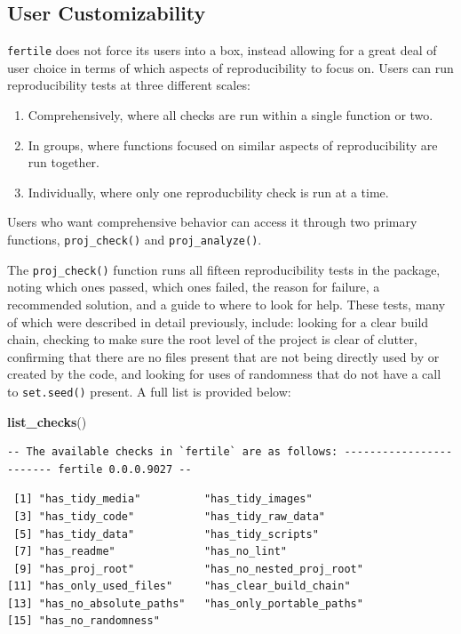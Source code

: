 \documentclass[12pt,twoside]{reedthesis}
\newenvironment{Shaded}{\begin{snugshade}}{\end{snugshade}}
\newcommand{\KeywordTok}[1]{\textcolor[rgb]{0.13,0.29,0.53}{\textbf{#1}}}
\newcommand{\NormalTok}[1]{#1}
\providecommand{\tightlist}{%
  \setlength{\itemsep}{0pt}\setlength{\parskip}{0pt}}
\begin{document}
\subsection{User Customizability}\label{user-customizability}

\texttt{fertile} does not force its users into a box, instead allowing
for a great deal of user choice in terms of which aspects of
reproducibility to focus on. Users can run reproducibility tests at
three different scales:
\begin{enumerate}
\def\labelenumi{\arabic{enumi})}
\tightlist
\item
  Comprehensively, where all checks are run within a single function or
  two.
\item
  In groups, where functions focused on similar aspects of
  reproducibility are run together.
\item
  Individually, where only one reproducbility check is run at a time.
\end{enumerate}
Users who want comprehensive behavior can access it through two primary
functions, \texttt{proj\_check()} and \texttt{proj\_analyze()}.

The \texttt{proj\_check()} function runs all fifteen reproducibility
tests in the package, noting which ones passed, which ones failed, the
reason for failure, a recommended solution, and a guide to where to look
for help. These tests, many of which were described in detail
previously, include: looking for a clear build chain, checking to make
sure the root level of the project is clear of clutter, confirming that
there are no files present that are not being directly used by or
created by the code, and looking for uses of randomness that do not have
a call to \texttt{set.seed()} present. A full list is provided below:

\footnotesize
\begin{Shaded}
\begin{Highlighting}[]
\KeywordTok{list_checks}\NormalTok{()}
\end{Highlighting}
\end{Shaded}
\begin{verbatim}
-- The available checks in `fertile` are as follows: ------------------------ fertile 0.0.0.9027 --
\end{verbatim}
\begin{verbatim}
 [1] "has_tidy_media"          "has_tidy_images"        
 [3] "has_tidy_code"           "has_tidy_raw_data"      
 [5] "has_tidy_data"           "has_tidy_scripts"       
 [7] "has_readme"              "has_no_lint"            
 [9] "has_proj_root"           "has_no_nested_proj_root"
[11] "has_only_used_files"     "has_clear_build_chain"  
[13] "has_no_absolute_paths"   "has_only_portable_paths"
[15] "has_no_randomness"      
\end{verbatim}
\normalsize
\end{document}
